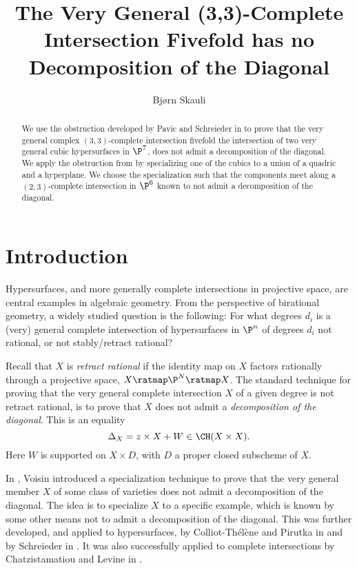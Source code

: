 
\title{The Very General (3,3)-Complete Intersection Fivefold has no Decomposition of the Diagonal}
\author{Bjørn Skauli}
\date{}
	\maketitle
\label{pap:33diagonal}
        \begin{abstract}
          We use the obstruction developed by Pavic and Schreieder in \cite{PavicSchreieder} to prove that the very general complex $(3,3)$-complete intersection fivefold \ie the intersection of two very general cubic hypersurfaces in $\P^7$, does not admit a decomposition of the diagonal. We apply the obstruction from \cite{PavicSchreieder} by specializing one of the cubics to a union of a quadric and a hyperplane. We choose the specialization such that the components meet along a $(2,3)$-complete intersection in $\P^6$ known to not admit a decomposition of the diagonal.
        \end{abstract}


\section{Introduction}
Hypersurfaces, and more generally complete intersections in projective space, are central examples in algebraic geometry. From the perspective of birational geometry, a widely studied question is the following: For what degrees $d_i$ is a (very) general complete intersection of hypersurfaces in $\P^n$ of degrees $d_i$ not rational, or not stably/retract rational?

Recall that $X$ is \emph{retract rational} if the identity map on $X$ factors rationally through a projective space, $X \ratmap \P^N \ratmap X$. The standard technique for proving that the very general complete intersection $X$ of a given degree is not retract rational, is to prove that $X$ does not admit a \emph{decomposition of the diagonal}. This is an equality
\[\Delta_X = z \times X + W \in \CH(X \times X). \]
Here $W$ is supported on $X \times D$, with $D$ a proper closed subscheme of $X$.

In \cite{VoisinUniversalCycle}, Voisin introduced a specialization technique to prove that the very general member $X$ of some class of varieties does not admit a decomposition of the diagonal. The idea is to specialize $X$ to a specific example, which is known  by some other means not to admit a decomposition of the diagonal. This was further developed, and applied to hypersurfaces, by Colliot-Thélène and Pirutka in \cite{ColliotThelenePirutka} and by Schreieder in \cite{SchreiederHypersurface}. It was also successfully applied to complete intersections by Chatzistamatiou and Levine in \cite{ChatzistamatiouLevine}.

